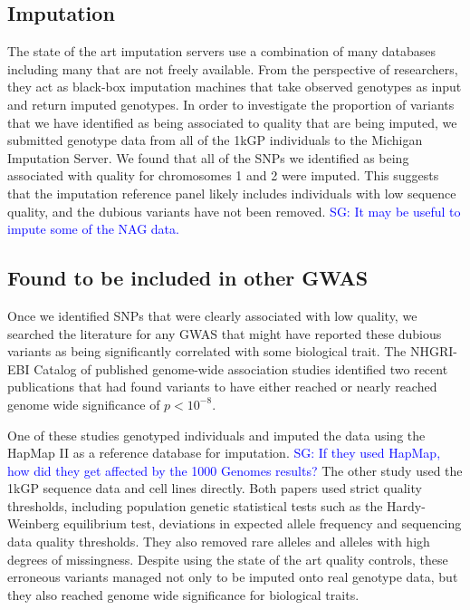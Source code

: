 \documentclass[9pt,lineno]{elife}
\newcommand{\sgcomment}[1]{\textcolor{blue}{SG: #1}}
\newcommand{\luke}[1]{\textcolor{blue}{Luke: #1}}
\begin{document}
\subsection{Imputation}
The state of the art imputation servers use a combination of many databases including many that are not freely available.
From the perspective of researchers, they act as black-box imputation machines that take observed genotypes as input and return imputed genotypes.  
In order to investigate the proportion of variants that we have identified as being associated to quality that are being imputed, we submitted genotype data from all of the 1kGP individuals to the Michigan Imputation Server.
We found that all of the SNPs we identified as being associated with quality for chromosomes 1 and 2 were imputed. 
This suggests that the imputation reference panel likely includes individuals with low sequence quality, and the dubious variants have not been removed. 
\sgcomment{It may be useful to impute some of the NAG data.} 


\subsection{Found to be included in other GWAS }
Once we identified SNPs that were clearly associated with low quality, we searched the literature for any GWAS that might have reported these dubious variants as being significantly correlated with some biological trait. 
The NHGRI-EBI Catalog of published genome-wide association studies identified two recent publications that had found variants to have either reached or nearly reached genome wide significance of $ p < 10^{-8}$.

One of these studies genotyped individuals and imputed the data using the HapMap II as a reference  database for imputation. \sgcomment{If they used HapMap, how did they get affected by the 1000 Genomes results?}
The other study used the 1kGP sequence data and cell lines directly.
Both papers used strict quality thresholds, including population genetic statistical tests such as the Hardy-Weinberg equilibrium test, deviations in expected allele frequency and sequencing data quality thresholds. 
They also removed rare alleles and alleles with high degrees of missingness. 
Despite using the state of the art quality controls, these erroneous variants managed not only to be imputed onto real genotype data, but they also reached genome wide significance for biological traits.
\end{document}
